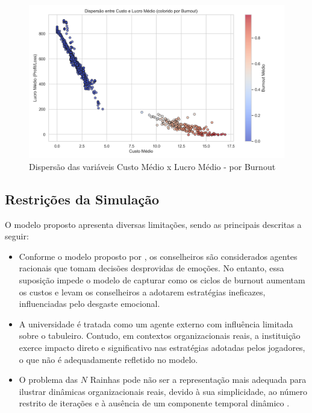 \documentclass[
	article,			%
	11pt,				%
	oneside,			%
	a4paper,			%
	english,			%
	brazil,				%
	sumario=tradicional
	]{abntex2}
\begin{document}
\begin{figure}[H]
    \centering
    \includegraphics[width=1\textwidth]{imagens/dispersao-custo-lucro-colorido-por-burnout.png}
    \caption{Dispersão das variáveis Custo Médio x Lucro Médio - por Burnout}
    \label{fig:dispersao-custo-lucro-burnout}
\end{figure}

\subsection{Restrições da Simulação}
O modelo proposto apresenta diversas limitações, sendo as principais descritas a seguir:

\begin{itemize}
    \item Conforme o modelo proposto por , os conselheiros são considerados agentes racionais que tomam decisões desprovidas de emoções. No entanto, essa suposição impede o modelo de capturar como os ciclos de burnout aumentam os custos e levam os conselheiros a adotarem estratégias ineficazes, influenciadas pelo desgaste emocional.

    \item A universidade é tratada como um agente externo com influência limitada sobre o tabuleiro. Contudo, em contextos organizacionais reais, a instituição exerce impacto direto e significativo nas estratégias adotadas pelos jogadores, o que não é adequadamente refletido no modelo.

    \item O problema das \( N \) Rainhas pode não ser a representação mais adequada para ilustrar dinâmicas organizacionais reais, devido à sua simplicidade, ao número restrito de iterações e à ausência de um componente temporal dinâmico \cite{rozier, BarrRao2006}.
\end{itemize}
\end{document}

